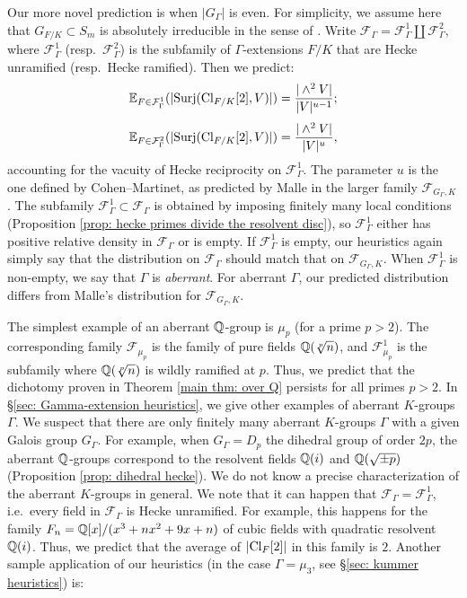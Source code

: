 \documentclass[11pt,a4paper]{amsart}
\def\Q{{\rm \mathbb{Q}}}
\def\Cl{{\rm Cl}}
\numberwithin{equation}{section}
\begin{document}
 Our more novel prediction is when $|G_\Gamma|$ is even.  For simplicity, we assume here that $G_{F/K} \subset S_m$ is absolutely irreducible in the sense of \cite{SawinWood}. Write $\mathcal{F}_\Gamma = \mathcal{F}_\Gamma^1 \coprod \mathcal{F}_\Gamma^2$, where $\mathcal{F}_\Gamma^1$ (resp.\ $\mathcal{F}_\Gamma^2$) is the subfamily of $\Gamma$-extensions $F/K$ that are Hecke unramified (resp.\ Hecke ramified). Then we predict: \begin{equation} \label{eqn: altered Malle}
    \mathbb{E}_{F \in \mathcal{F}_\Gamma^1}(|\mathrm{Surj}(\Cl_{F/K}[2],V)|) = \dfrac{| \wedge^2 V|}{|V|^{u-1}};
\end{equation}
\begin{equation} \label{eqn: Malle again}
    \mathbb{E}_{F \in \mathcal{F}_\Gamma^2}(|\mathrm{Surj}(\Cl_{F/K}[2],V)|) = \dfrac{| \wedge^2 V|}{|V|^{u}},
\end{equation}
accounting for the vacuity of Hecke reciprocity on $\mathcal{F}_\Gamma^1$. The parameter $u$ is the one defined by Cohen--Martinet, as predicted by Malle in the larger family $\mathcal{F}_{G_\Gamma,K}$ \cite[\S2]{Malle2010}.  The subfamily $\mathcal{F}_\Gamma^1 \subset \mathcal{F}_\Gamma$ is obtained by imposing finitely many local conditions (Proposition \ref{prop: hecke primes divide the resolvent disc}), so $\mathcal{F}_\Gamma^1$ either has positive relative density in $\mathcal{F}_\Gamma$ or is empty.  If $\mathcal{F}_\Gamma^1$ is empty, our heuristics again simply say that the distribution on $\mathcal{F}_\Gamma$ should match that on $\mathcal{F}_{G_\Gamma,K}$.  When $\mathcal{F}_\Gamma^1$ is non-empty, we say that $\Gamma$ is {\it aberrant}.  For aberrant $\Gamma$, our predicted distribution differs from Malle's distribution for $\mathcal{F}_{G_\Gamma,K}$. 

The simplest example of an aberrant $\Q$-group is $\mu_p$ (for a prime $p > 2$). The corresponding family $\mathcal{F}_{\mu_p}$ is the family of pure fields $\Q(\sqrt[p]{n})$, and $\mathcal{F}_{\mu_p}^1$ is the subfamily where $\Q(\sqrt[p]{n})$ is wildly ramified at $p$. Thus, we predict that the  dichotomy proven in Theorem \ref{main thm: over Q} persists for all primes $p > 2$.  In \S\ref{sec: Gamma-extension heuristics}, we give other examples of aberrant $K$-groups $\Gamma$. We suspect that there are only finitely many aberrant $K$-groups $\Gamma$ with a given Galois group $G_\Gamma$. For example, when $G_\Gamma = D_p$ the dihedral group of order $2p$, the aberrant $\Q$-groups correspond to the resolvent fields $\Q(i)$ and $ \Q(\sqrt{\pm p})$ (Proposition \ref{prop: dihedral hecke}).  We do not know a precise characterization of the aberrant $K$-groups in general. We note that it can happen that $\mathcal{F}_\Gamma = \mathcal{F}_{\Gamma}^1$, i.e.\ every field in $\mathcal{F}_\Gamma$ is Hecke unramified. For example, this happens for the family $F_n = \Q[x]/(x^3 + nx^2 + 9x + n)$ of cubic fields with quadratic resolvent $\Q(i)$. Thus, we predict that the average of $|\Cl_F[2]|$ in this family is $2$.  Another sample application of our heuristics (in the case $\Gamma = \mu_3$, see \S \ref{sec: kummer heuristics}) is:
\end{document}
